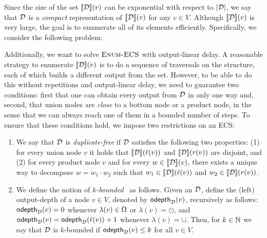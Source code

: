 Since the size of the set ${\llbracket{\mathcal{D}}\rrbracket}(v)$ can be exponential with respect to $|\mathcal{D}|$, we say that $\mathcal{D}$ is a \emph{compact} representation of ${\llbracket{\mathcal{D}}\rrbracket}(v)$ for any $v \in V$.
Although ${\llbracket{\mathcal{D}}\rrbracket}(v)$ is very large, the goal is to enumerate all of its elements efficiently. Specifically, we consider the following problem:
\begin{center}
\end{center}
\vspace{.1cm}
Additionally, we want to solve $\textsc{Enum-ECS}$ with output-linear delay. 
A reasonable strategy to enumerate ${\llbracket{\mathcal{D}}\rrbracket}(v)$ is to do a sequence of traversals on the structure, each of which builds a different output from the set. 
However, to be able to do this without repetitions and output-linear delay, we need to guarantee two conditions: first that one can obtain every output from $\mathcal{D}$ in only one way and, second, that union nodes are {\it close} to a bottom node or a product node, in the sense that we can always reach one of them in a bounded number of steps. To ensure that these conditions hold, we impose two restrictions on an ECS:
\begin{enumerate}
	\item We say that $\mathcal{D}$ is \emph{duplicate-free} if $\mathcal{D}$ satisfies the following two properties: (1) for every union node $v$ it holds that ${\llbracket{\mathcal{D}}\rrbracket}(\ell(v))$ and ${\llbracket{\mathcal{D}}\rrbracket}(r(v))$ are disjoint, and (2) for every product node $v$ and for every $w \in {\llbracket{\mathcal{D}}\rrbracket}(v)$, there exists a unique way to decompose $w = w_1 \cdot w_2$ such that $w_1 \in {\llbracket{\mathcal{D}}\rrbracket}(\ell(v))$ and $w_2 \in {\llbracket{\mathcal{D}}\rrbracket}(r(v))$. 
	
	\item We define the notion of \emph{$k$-bounded}~\dsabbr{} as follows. 
	Given an \dsabbr{} $\mathcal{D}$, define the (left) output-depth of a node $v\in V$, denoted by $\mathsf{odepth}_{\mathcal{D}}(v)$, recursively as follows:
	$\mathsf{odepth}_{\mathcal{D}}(v) = 0$ whenever $\lambda(v)\in\Omega$ or $\lambda(v) = \odot$, and $\mathsf{odepth}_{\mathcal{D}}(v) = \mathsf{odepth}_{\mathcal{D}}(\ell(v))+1$ whenever $\lambda(v) = \cup$.
	Then, for $k\in\mathbb{N}$ we say that $\mathcal{D}$ is $k$-bounded if $\mathsf{odepth}_{\mathcal{D}}(v)\leq k$ for all $v\in V$.
\end{enumerate}



